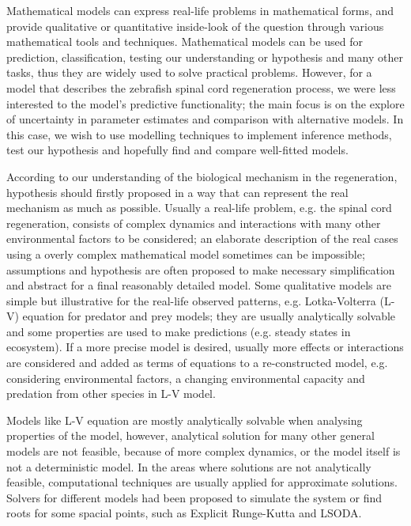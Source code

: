 
Mathematical models can express real-life problems in mathematical forms, and provide qualitative or quantitative inside-look of the question through various mathematical tools and techniques. Mathematical models can be used for prediction, classification, testing our understanding or hypothesis and many other tasks, thus they are widely used to solve practical problems. However, for a model that describes the zebrafish spinal cord regeneration process, we were less interested to the model's predictive functionality; the main focus is on the explore of uncertainty in parameter estimates and comparison with alternative models. In this case, we wish to use modelling techniques to implement inference methods, test our hypothesis and hopefully find and compare well-fitted models.

According to our understanding of the biological mechanism in the regeneration, hypothesis should firstly proposed in a way that can represent the real  mechanism as much as possible. Usually a real-life problem, e.g. the spinal cord regeneration, consists of complex dynamics and interactions with many other environmental factors to be considered; an elaborate description of the real cases using a overly complex mathematical model sometimes can be impossible; assumptions and hypothesis are often proposed to make necessary simplification and abstract for a final reasonably detailed model. Some qualitative models are simple but illustrative for the real-life observed patterns, e.g. Lotka-Volterra (L-V) equation for predator and prey models; they are usually analytically solvable and some properties are used to make predictions (e.g. steady states in ecosystem). If a more precise model is desired, usually more effects or interactions are considered and added as terms of equations to a re-constructed model, e.g. considering environmental factors, a changing environmental capacity and predation from other species in L-V model.

Models like L-V equation are mostly analytically solvable when analysing properties of the model, however, analytical solution for many other general models are not feasible, because of more complex dynamics, or the model itself is not a deterministic model. In the areas where solutions are not analytically feasible, computational techniques are usually applied for approximate solutions. Solvers for different models had been proposed to simulate the system or find roots for some spacial points, such as Explicit Runge-Kutta \cite{dormand1980family} and LSODA.

